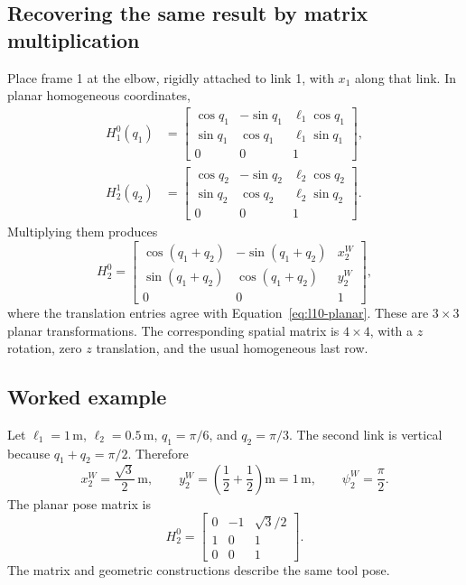 \subsection{Recovering the same result by matrix multiplication}
Place frame 1 at the elbow, rigidly attached to link 1, with $x_1$ along
that link. In planar homogeneous coordinates,
\begin{align}
 H_1^0(q_1)&=\begin{bmatrix}
 \cos q_1&-\sin q_1&\ell_1\cos q_1\\
 \sin q_1&\cos q_1&\ell_1\sin q_1\\0&0&1
 \end{bmatrix},\\
 H_2^1(q_2)&=\begin{bmatrix}
 \cos q_2&-\sin q_2&\ell_2\cos q_2\\
 \sin q_2&\cos q_2&\ell_2\sin q_2\\0&0&1
 \end{bmatrix}.
\end{align}
Multiplying them produces
\begin{equation}
 H_2^0=\begin{bmatrix}
 \cos(q_1+q_2)&-\sin(q_1+q_2)&x_2^W\\
 \sin(q_1+q_2)&\cos(q_1+q_2)&y_2^W\\
 0&0&1
 \end{bmatrix},
 \label{eq:l10-planarmatrix}
\end{equation}
where the translation entries agree with Equation~\eqref{eq:l10-planar}.
These are $3\times3$ planar transformations. The corresponding spatial
matrix is $4\times4$, with a $z$ rotation, zero $z$ translation, and the
usual homogeneous last row.

\subsection{Worked example}
Let $\ell_1=1\,\mathrm m$, $\ell_2=0.5\,\mathrm m$,
$q_1=\pi/6$, and $q_2=\pi/3$. The second link is vertical because
$q_1+q_2=\pi/2$. Therefore
\[
 x_2^W=\frac{\sqrt3}{2}\,\mathrm m,\qquad
 y_2^W=\left(\frac12+\frac12\right)\mathrm m=1\,\mathrm m,
 \qquad\psi_2^W=\frac\pi2.
\]
The planar pose matrix is
\[
 H_2^0=\begin{bmatrix}0&-1&\sqrt3/2\\1&0&1\\0&0&1\end{bmatrix}.
\]
The matrix and geometric constructions describe the same tool pose.

